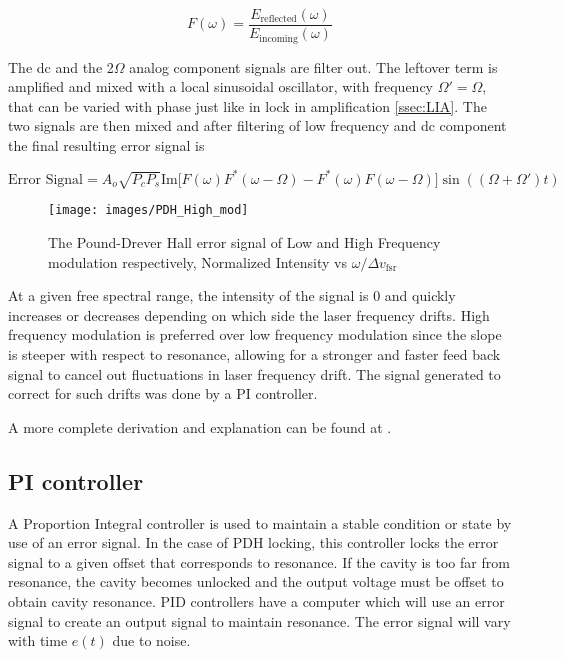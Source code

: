 \documentclass[a4paper]{book}
\begin{document}
		\begin{equation}
			F(\omega)=\frac{E_\text{reflected}(\omega)}{E_\text{incoming}(\omega)}
		\end{equation}
		
		The dc and the 2$\Omega$ analog component signals are filter out. The leftover term is amplified and mixed with a local sinusoidal oscillator, with frequency $\Omega' = \Omega$, that can be varied with phase just like in lock in amplification \ref{ssec:LIA}. The two signals are then mixed and after filtering of low frequency and dc component the final resulting error signal is
		
		\begin{equation}
			\text{Error Signal}= A_o \sqrt{P_c P_s} \text{Im}\big[F(\omega)F^*(\omega - \Omega)-F^*(\omega) F(\omega - \Omega) \big]\sin((\Omega + \Omega')t)
		\end{equation}
		
		\begin{figure}[h]
			\centering
			\texttt{[image: images/PDH\_High\_mod]}
			\caption{ The Pound-Drever Hall error signal of Low and High Frequency modulation respectively, Normalized Intensity vs $\omega /\Delta v_{\text{fsr}}$ \cite{PDH Intro} } 
			\label{HFM PDH}
		\end{figure}
		
		At a given free spectral  range, the intensity of the signal is 0 and quickly increases or decreases depending on which side the laser frequency drifts. 
		High frequency modulation is preferred over low frequency modulation since the slope is steeper with respect to resonance, allowing for a stronger and faster feed back signal to cancel out fluctuations in laser frequency drift. The signal generated to correct for such drifts was done by a PI controller.
		
		A more complete derivation and explanation can be found at \cite{PDH Intro}.
		
		\subsection{PI controller}
			\label{subsec:PI controller}
			A Proportion Integral controller is used to maintain a stable condition or state by use of an error signal. In the case of PDH locking, this controller locks the error signal to a given offset that corresponds to resonance. If the cavity is too far from resonance, the cavity becomes unlocked and the output voltage must be offset to obtain cavity resonance.
			PID controllers have a computer which will use an error signal to create an output signal to maintain resonance. The error signal will vary with time $e(t)$ due to noise.
			
\end{document}
